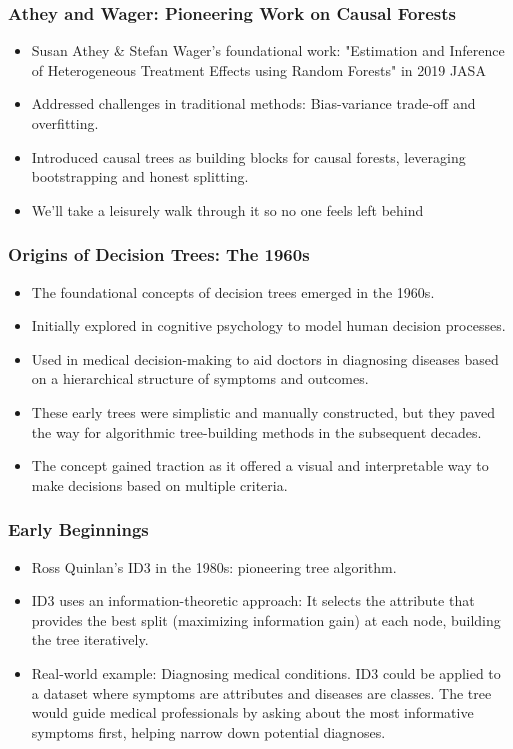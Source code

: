 \documentclass{beamer}
\begin{document}
\begin{frame}
\frametitle{Athey and Wager: Pioneering Work on Causal Forests}
\begin{itemize}
    \item Susan Athey \& Stefan Wager's foundational work: "Estimation and Inference of Heterogeneous Treatment Effects using Random Forests" in 2019 JASA
    \item Addressed challenges in traditional methods: Bias-variance trade-off and overfitting.
    \item Introduced causal trees as building blocks for causal forests, leveraging bootstrapping and honest splitting.
    \item We'll take a leisurely walk through it so no one feels left behind
\end{itemize}
\end{frame}


\begin{frame}
\frametitle{Origins of Decision Trees: The 1960s}
\begin{itemize}
    \item The foundational concepts of decision trees emerged in the 1960s.
    \item Initially explored in cognitive psychology to model human decision processes.
    \item Used in medical decision-making to aid doctors in diagnosing diseases based on a hierarchical structure of symptoms and outcomes.
    \item These early trees were simplistic and manually constructed, but they paved the way for algorithmic tree-building methods in the subsequent decades.
    \item The concept gained traction as it offered a visual and interpretable way to make decisions based on multiple criteria.
\end{itemize}
\end{frame}

\begin{frame}
\frametitle{Early Beginnings}
\begin{itemize}
    \item Ross Quinlan's ID3 in the 1980s: pioneering tree algorithm.
    \item ID3 uses an information-theoretic approach: It selects the attribute that provides the best split (maximizing information gain) at each node, building the tree iteratively.
    \item Real-world example: Diagnosing medical conditions. ID3 could be applied to a dataset where symptoms are attributes and diseases are classes. The tree would guide medical professionals by asking about the most informative symptoms first, helping narrow down potential diagnoses.
\end{itemize}
\end{frame}
\end{document}

